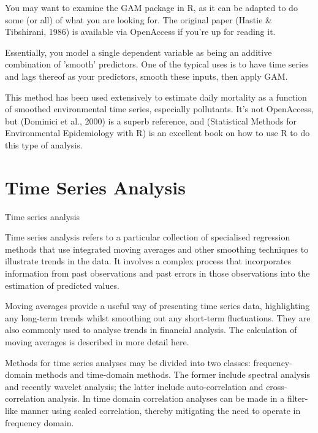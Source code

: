 \documentclass{article}\usepackage[]{graphicx}\usepackage[]{color}
\begin{document}
You may want to examine the GAM package in R, as it can be adapted to do some (or all) of what you are looking for. The original paper (Hastie \& Tibshirani, 1986) is available via OpenAccess if you're up for reading it.

Essentially, you model a single dependent variable as being an additive combination of 'smooth' predictors. One of the typical uses is to have time series and lags thereof as your predictors, smooth these inputs, then apply GAM.

This method has been used extensively to estimate daily mortality as a function of smoothed environmental time series, especially pollutants. It's not OpenAccess, but (Dominici et al., 2000) is a superb reference, and (Statistical Methods for Environmental Epidemiology with R) is an excellent book on how to use R to do this type of analysis.

\section{Time Series Analysis}

Time series analysis

Time series analysis refers to a particular collection of specialised regression methods that use integrated moving averages and other smoothing techniques to illustrate trends in the data. It involves a complex process that incorporates information from past observations and past errors in those observations into the estimation of predicted values.

Moving averages provide a useful way of presenting time series data, highlighting any long-term trends whilst smoothing out any short-term fluctuations. They are also commonly used to analyse trends in financial analysis. The calculation of moving averages is described in more detail here.

Methods for time series analyses may be divided into two classes: frequency-domain methods and time-domain methods. The former include spectral analysis and recently wavelet analysis; the latter include auto-correlation and cross-correlation analysis. In time domain correlation analyses can be made in a filter-like manner using scaled correlation, thereby mitigating the need to operate in frequency domain.
\end{document}
